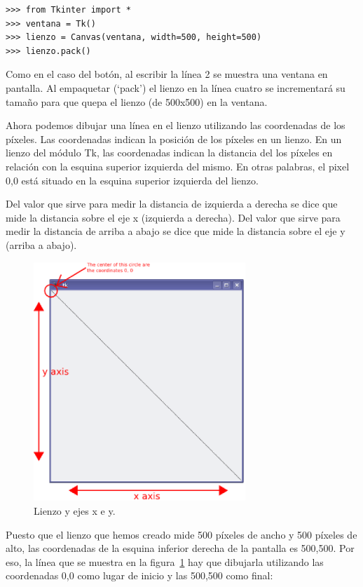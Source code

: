 \begin{listing}
\begin{verbatim}
>>> from Tkinter import *
>>> ventana = Tk()
>>> lienzo = Canvas(ventana, width=500, height=500)
>>> lienzo.pack()
\end{verbatim}
\end{listing}

Como en el caso del botón, al escribir la línea 2 se muestra una ventana en pantalla. Al empaquetar (`pack') el lienzo en la línea cuatro se incrementará su tamaño para que quepa el lienzo (de 500x500) en la ventana.

Ahora podemos dibujar una línea en el lienzo utilizando las coordenadas de los píxeles.  Las coordenadas indican la posición de los píxeles en un lienzo.  En un lienzo del módulo Tk, las coordenadas indican la distancia del los píxeles en relación con la esquina superior izquierda del mismo. En otras palabras, el pixel 0,0 está situado en la esquina superior izquierda del lienzo.  

Del valor que sirve para medir la distancia de izquierda a derecha se dice que mide la distancia sobre el eje x (izquierda a derecha).  Del valor que sirve para medir la distancia de arriba a abajo se dice que mide la distancia sobre el eje y (arriba a abajo).

\begin{figure}
\begin{center}
\includegraphics[width=80mm]{figure32.eps}
\end{center}
\caption{Lienzo y ejes x e y.}\label{fig32}
\end{figure}

Puesto que el lienzo que hemos creado mide 500 píxeles de ancho y 500 píxeles de alto, las coordenadas de la esquina inferior derecha de la pantalla es 500,500. Por eso, la línea que se muestra en la figura~\ref{fig32} hay que dibujarla utilizando las coordenadas 0,0 como lugar de inicio y las 500,500 como final:


